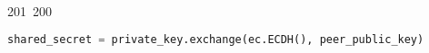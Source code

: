 201~200~\documentclass{article}
\begin{document}
\begin{lstlisting}[language=Python, caption=Shared Secret Computation and Encryption Key Derivation]
	                                                                                                                                                                                                                                                                                                	                                                                                                                                        	    	                                                                                                	                                                                                                                                                                                                                                                                                                                                	                                                                        	                                                                        	                                                                                                                                        	                                                                                                                                                                                                                shared_secret = private_key.exchange(ec.ECDH(), peer_public_key)
	                                                                                                                                                                                                                                                                                                	                                                                                                                                        	    	                                                                                                	                                                                                                                                                                                                                                                                                                                                	                                                                        	                                                                        	                                                                                                                                        	                                                                                                                                                                                                                    return shared_secret


\end{lstlisting}
\end{document}
